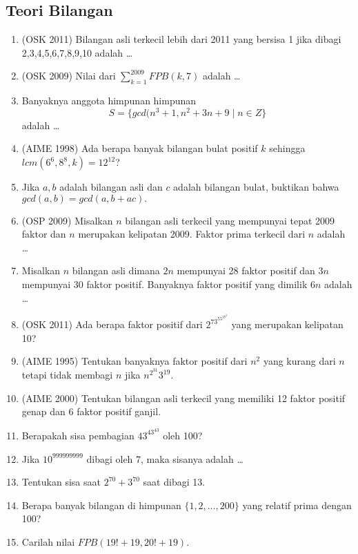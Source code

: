\documentclass[11pt]{scrartcl}
\begin{document}
\subsection{Teori Bilangan}
    \begin{enumerate}
        \item (OSK 2011) Bilangan asli terkecil lebih dari 2011 yang bersisa 1 jika dibagi 2,3,4,5,6,7,8,9,10 adalah \dots
        
        \item (OSK 2009) Nilai dari $\sum_{k=1}^{2009} FPB(k,7)$ adalah \dots
        
        \item Banyaknya anggota himpunan himpunan 
        $$S = \{gcd(n^3+1,n^2+3n+9 \mid n \in Z\}$$
        adalah \dots
        
        \item (AIME 1998) Ada berapa banyak bilangan bulat positif $k$ sehingga $lcm(6^6,8^8,k)=12^{12}$?
        
        \item Jika $a,b$ adalah bilangan asli dan $c$ adalah bilangan bulat, buktikan bahwa $gcd(a,b)=gcd(a,b+ac).$
        
        \item (OSP 2009) Misalkan $n$ bilangan asli terkecil yang mempunyai tepat 2009 faktor dan $n$ merupakan kelipatan 2009. Faktor prima terkecil dari $n$ adalah \dots
        
        \item Misalkan $n$ bilangan asli dimana $2n$ mempunyai 28 faktor positif dan $3n$ mempunyai 30 faktor positif. Banyaknya faktor positif yang dimilik $6n$ adalah \dots
        
        \item (OSK 2011) Ada berapa faktor positif dari $2^73^55^37^2$ yang merupakan kelipatan 10?
        
        \item (AIME 1995) Tentukan banyaknya faktor positif dari $n^2$ yang kurang dari $n$ tetapi tidak membagi $n$ jika $n^{2^{31}}3^{19}.$
        
        \item (AIME 2000) Tentukan bilangan asli terkecil yang memiliki 12 faktor positif genap dan $6$ faktor positif ganjil.
        
        \item Berapakah sisa pembagian $43^{43^{43}}$ oleh 100?
        
        \item Jika $10^{999999999}$ dibagi oleh 7, maka sisanya adalah \dots
        
        \item Tentukan sisa saat $2^{70}+3^{70}$ saat dibagi 13.
        
        \item Berapa banyak bilangan di himpunan $\{1,2,\dots,200\}$ yang relatif prima dengan 100?
        
        \item Carilah nilai $FPB(19!+19,20!+19).$

 \end{enumerate}
 
\end{document}
